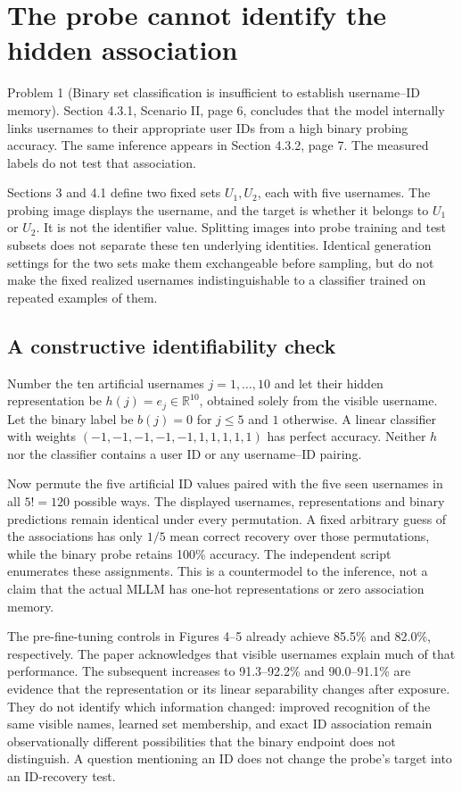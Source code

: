 \documentclass[10pt]{article}
\begin{document}
\section*{The probe cannot identify the hidden association}
Problem 1 (Binary set classification is insufficient to establish username–ID memory).  Section 4.3.1, Scenario II, page 6, concludes that the model internally links usernames to their appropriate user IDs from a high binary probing accuracy. The same inference appears in Section 4.3.2, page 7. The measured labels do not test that association.\par
Sections 3 and 4.1 define two fixed sets \(U_1,U_2\), each with five usernames. The probing image displays the username, and the target is whether it belongs to \(U_1\) or \(U_2\). It is not the identifier value. Splitting images into probe training and test subsets does not separate these ten underlying identities. Identical generation settings for the two sets make them exchangeable before sampling, but do not make the fixed realized usernames indistinguishable to a classifier trained on repeated examples of them.\par
\subsection*{A constructive identifiability check}
Number the ten artificial usernames \(j=1,\ldots,10\) and let their hidden representation be \(h(j)=e_j\in\mathbb R^{10}\), obtained solely from the visible username. Let the binary label be \(b(j)=0\) for \(j\leq5\) and \(1\) otherwise. A linear classifier with weights \((-1,-1,-1,-1,-1,1,1,1,1,1)\) has perfect accuracy. Neither \(h\) nor the classifier contains a user ID or any username–ID pairing.\par
Now permute the five artificial ID values paired with the five seen usernames in all \(5!=120\) possible ways. The displayed usernames, representations and binary predictions remain identical under every permutation. A fixed arbitrary guess of the associations has only \(1/5\) mean correct recovery over those permutations, while the binary probe retains 100\% accuracy. The independent script enumerates these assignments. This is a countermodel to the inference, not a claim that the actual MLLM has one-hot representations or zero association memory.\par
The pre-fine-tuning controls in Figures 4–5 already achieve 85.5\% and 82.0\%, respectively. The paper acknowledges that visible usernames explain much of that performance. The subsequent increases to 91.3–92.2\% and 90.0–91.1\% are evidence that the representation or its linear separability changes after exposure. They do not identify which information changed: improved recognition of the same visible names, learned set membership, and exact ID association remain observationally different possibilities that the binary endpoint does not distinguish. A question mentioning an ID does not change the probe’s target into an ID-recovery test.\par
\end{document}
